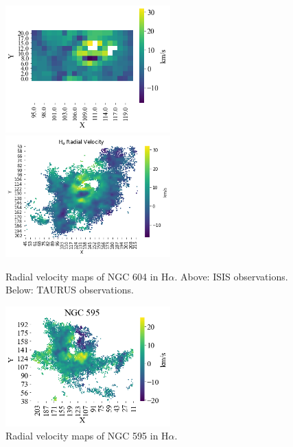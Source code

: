 \documentclass[fleqn,usenatbib]{mnras}
\begin{document}
\begin{figure}
\centering 
\includegraphics[width=2.5in]{Figures/6ISIS.png}
\includegraphics[width=2.5in]{Figures/6TAU.png}
\caption{Radial velocity maps of NGC 604 in H$\alpha$. Above: ISIS observations. Below: TAURUS observations. }
\label{fig:M604}
\end{figure}

\begin{figure}
\centering 
\includegraphics[width=2.5in]{Figures/5TAU.png}
\caption{Radial velocity maps of NGC 595 in H$\alpha$.}
\label{fig:M595}
\end{figure}
\end{document}
